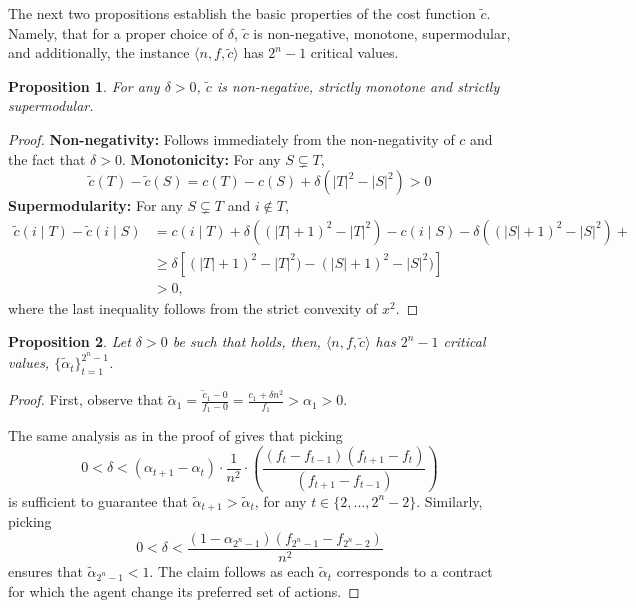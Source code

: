 \documentclass[11pt]{article}
\newtheorem{proposition}{Proposition}
\newcommand{\inst}[3]{\langle #1, #2, #3 \rangle}
\newcommand{\tc}{\tilde{c}}
\newcommand{\talpha}{\tilde{\alpha}}
\begin{document}
The next two propositions establish the basic properties of the cost function $\tc$. Namely, that for a proper choice of $\delta$, $\tc$ is non-negative, monotone, supermodular, and additionally, the instance $\inst{n}{f}{\tc}$ has $2^n-1$ critical values.

\begin{proposition}\label{prop:tc_nonNeg_monotone_supMod}
For any $\delta > 0$, $\tc$ is non-negative, strictly monotone and strictly supermodular.
\end{proposition}

\begin{proof}
\textbf{Non-negativity:} Follows immediately from the non-negativity of $c$ and the fact that $\delta >0$.
\textbf{Monotonicity:}
For any $S \subsetneq T$,
$$
\tc(T) - \tc(S) = c(T)-c(S) + \delta(|T|^2-|S|^2) > 0
$$
\textbf{Supermodularity:}
For any $S \subsetneq T$ and $i \notin T$,
\begin{align*}
\tc(i \mid T) - \tc(i \mid S)
&=
c(i \mid T) + \delta((|T|+1)^2-|T|^2) - c(i \mid S) - \delta((|S|+1)^2-|S|^2) +  \\
&\ge 
\delta 
[(|T|+1)^2-|T|^2) - (|S|+1)^2-|S|^2)] \\
&>0,  
\end{align*}
where the last inequality follows from the strict convexity of $x^2$.
\end{proof}

\begin{proposition}\label{prop:exp_many_cvs_maintained_SupMod_c}
Let $\delta > 0$ be such that  holds, then, $\inst{n}{f}{\tc}$ has $2^n-1$ critical values, $\{\talpha_t\}_{t=1}^{2^n-1}$.
\end{proposition}

\begin{proof}
First, observe that
$\talpha_{1} = \frac{\tc_{1} - 0}{f_1 - 0} =\frac{c_1 + \delta n^2}{f_1} > \alpha_1 > 0$.

The same analysis as in the proof of  gives that 
picking
$$
0 < \delta < (\alpha_{t+1}-\alpha_t)\cdot \frac{1}{n^2} \cdot \left(\frac{(f_t-f_{t-1})(f_{t+1}-f_t)}{(f_{t+1}-f_{t-1})}\right)
$$
is sufficient to guarantee that $\talpha_{t+1} > \talpha_t$, for any $t\in \{2,\dots,2^n-2\}$.
Similarly, picking 
$$
0 < \delta < \frac{(1-\alpha_{2^n-1})(f_{2^n-1}-f_{2^n-2})}{n^2}
$$
ensures that $\talpha_{2^n-1} <1$.
The claim follows as each $\talpha_t$ corresponds to a contract for which the agent change its preferred set of actions.
\end{proof}
\end{document}
